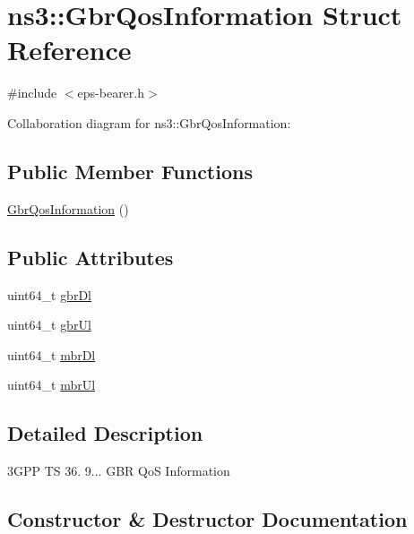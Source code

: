 \hypertarget{structns3_1_1GbrQosInformation}{}\section{ns3\+:\+:Gbr\+Qos\+Information Struct Reference}
\label{structns3_1_1GbrQosInformation}


{\ttfamily \#include $<$eps-\/bearer.\+h$>$}



Collaboration diagram for ns3\+:\+:Gbr\+Qos\+Information\+:
\subsection*{Public Member Functions}
\begin{DoxyCompactItemize}
\item 
\hyperlink{structns3_1_1GbrQosInformation_a7a04caa103866eded620a347dea995ea}{Gbr\+Qos\+Information} ()
\end{DoxyCompactItemize}
\subsection*{Public Attributes}
\begin{DoxyCompactItemize}
\item 
uint64\+\_\+t \hyperlink{structns3_1_1GbrQosInformation_a70b6106f5918d464d296bc23415ec801}{gbr\+Dl}
\item 
uint64\+\_\+t \hyperlink{structns3_1_1GbrQosInformation_a8027f26c8fd5fd643d5af7a6a879860f}{gbr\+Ul}
\item 
uint64\+\_\+t \hyperlink{structns3_1_1GbrQosInformation_ac059dd3ad95475e8df63e52d9c2235e7}{mbr\+Dl}
\item 
uint64\+\_\+t \hyperlink{structns3_1_1GbrQosInformation_afce406e4f92771305075ace6cfe83e36}{mbr\+Ul}
\end{DoxyCompactItemize}


\subsection{Detailed Description}
3\+G\+PP TS 36. 9... G\+BR QoS Information 

\subsection{Constructor \& Destructor Documentation}
